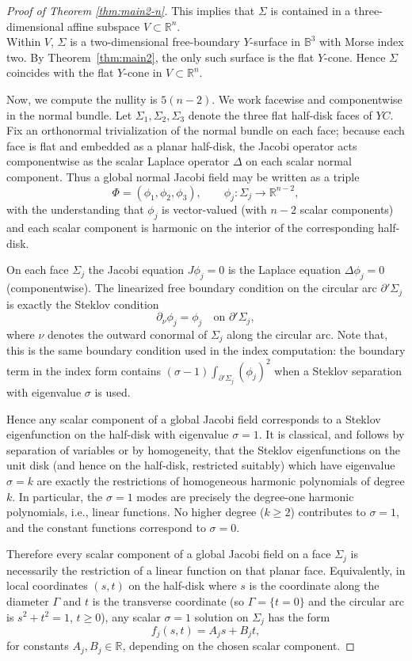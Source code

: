 \documentclass[10pt,a4paper]{amsart}
\begin{document}
\begin{proof}[Proof of Theorem \ref{thm:main2-n}]
This implies that $\Sigma$ is contained in a three-dimensional affine subspace $V \subset \mathbb{R}^n$.\\
Within $V$, $\Sigma$ is a two-dimensional free-boundary $Y$-surface in $\mathbb{B}^3$ with Morse index two. By Theorem~\ref{thm:main2}, the only such surface is the flat $Y$-cone. Hence $\Sigma$ coincides with the flat $Y$-cone in $V \subset \mathbb{R}^n$.
\medskip


Now, we compute the nullity is $5(n-2)$. We work facewise and componentwise in the normal bundle.  Let $\Sigma_1,\Sigma_2,\Sigma_3$ denote the three flat half-disk faces of $YC$.  Fix an orthonormal trivialization of the normal bundle on each face; because each face is flat and embedded as a planar half-disk, the Jacobi operator acts componentwise as the scalar Laplace operator $\Delta$ on each scalar normal component.  Thus a global normal Jacobi field may be written as a triple
\[
\Phi=(\phi_1,\phi_2,\phi_3),\qquad \phi_j:\Sigma_j\to\mathbb{R}^{n-2},
\]
with the understanding that $\phi_j$ is vector-valued (with $n-2$ scalar components) and each scalar component is harmonic on the interior of the corresponding half-disk.
\medskip

On each face $\Sigma_j$ the Jacobi equation $J\phi_j=0$ is the Laplace equation $\Delta \phi_j=0$ (componentwise). The linearized free boundary condition on the circular arc $\partial'\Sigma_j$ is exactly the Steklov condition
\[
\partial_\nu \phi_j = \phi_j \quad\text{on }\partial'\Sigma_j,
\]
where $\nu$ denotes the outward conormal of $\Sigma_j$ along the circular arc. Note that, this is the same boundary condition used in the index computation: the boundary term in the index form contains $(\sigma-1)\int_{\partial'\Sigma_j}(\phi_j)^2$ when a Steklov separation with eigenvalue $\sigma$ is used.  

Hence any scalar component of a global Jacobi field corresponds to a Steklov eigenfunction on the half-disk with eigenvalue $\sigma=1$.  It is classical, and follows by separation of variables or by homogeneity, that the Steklov eigenfunctions on the unit disk (and hence on the half-disk, restricted suitably) which have eigenvalue $\sigma=k$ are exactly the restrictions of homogeneous harmonic polynomials of degree $k$.  In particular, the $\sigma=1$ modes are precisely the degree-one harmonic polynomials, i.e., linear functions.  No higher degree ($k\ge2$) contributes to $\sigma=1$, and the constant functions correspond to $\sigma=0$.

Therefore every scalar component of a global Jacobi field on a face $\Sigma_j$ is necessarily the restriction of a linear function on that planar face.  Equivalently, in local coordinates $(s,t)$ on the half-disk where $s$ is the coordinate along the diameter $\Gamma$ and $t$ is the transverse coordinate (so $\Gamma=\{t=0\}$ and the circular arc is $s^2+t^2=1$, $t\ge0$), any scalar $\sigma=1$ solution on $\Sigma_j$ has the form
\[
f_j(s,t) = A_j s + B_j t,
\]
for constants $A_j,B_j\in\mathbb{R}$, depending on the chosen scalar component.
\medskip


\end{proof}
\end{document}
